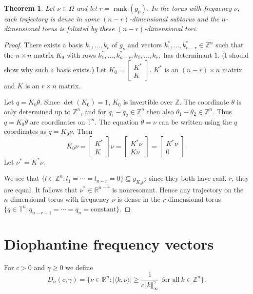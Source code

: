 \documentclass{article}
\newtheorem{theorem}{Theorem}
\newcommand{\norm}[1]{\Vert #1 \Vert}
\newcommand{\rank}{\operatorname{rank}}
\begin{document}
\begin{theorem}
Let $\nu \in \Omega$ and let $r=\rank(g_\nu)$. In the torus with frequency $\nu$, each trajectory is dense in some
$(n-r)$-dimensional subtorus and the $n$-dimensional torus is foliated
by these $(n-r)$-dimensional tori.
\end{theorem}
\begin{proof}
There exists a basis $k_1,\ldots,k_r$ of $g_\nu$ and vectors
$k_1^*,\ldots,k_{n-r}^* \in \mathbb{Z}^n$ such that the $n \times n$ matrix $K_0$ with rows
$k_1^*,\ldots,k_{n-r}^*,k_1,\ldots,k_r,$ has determinant $1$. (I should
show why such a basis exists.)
Let $K_0=\begin{bmatrix}K^*\\K \end{bmatrix}$. $K^*$ is an $(n-r) \times n$ matrix
and $K$ is an $r \times n$ matrix.

Let $q=K_0 \theta$. Since $\det(K_0)=1$, $K_0$ is invertible over
$\mathbb{Z}$. The coordinate $\theta$ is only determined up to
$\mathbb{Z}^n$, and for $q_1-q_2 \in \mathbb{Z}^n$ then also
$\theta_1-\theta_2 \in \mathbb{Z}^n$. Thus $q=K_0 \theta$ are coordinates
on $\mathbb{T}^n$.
The equation $\dot{\theta}=\nu$ can be written using the $q$ coordinates
as $\dot{q}=K_0 \nu$. Then
\[
K_0 \nu=\begin{bmatrix}K^*\\K\end{bmatrix}\nu=
\begin{bmatrix}K^* \nu\\K \nu \end{bmatrix}=
\begin{bmatrix}K^* \nu\\0 \end{bmatrix}.
\]
Let $\nu^*=K^* \nu$.

We see that $\{l \in \mathbb{Z}^n:l_1=\cdots=l_{n-r}=0\} \subseteq g_{K_0 \nu}$; since they both have rank $r$, they are equal. It follows that $\nu^* \in \mathbb{R}^{n-r}$ is
nonresonant. Hence any trajectory on the $n$-dimensional torus with frequency
$\nu$ is dense in the $r$-dimensional torus $\{q \in \mathbb{T}^n:
q_{n-r+1}=\cdots=q_n=\text{constant}\}$.
\end{proof}


\section{Diophantine frequency vectors}
For $c>0$ and $\gamma \geq 0$ we define 
\[
D_n(c,\gamma)=\{\nu \in \mathbb{R}^n: |\langle k,\nu \rangle| \geq
\frac{1}{c\norm{k}_\infty^\gamma} \ \ \textrm{for all} \ k \in \mathbb{Z}^n\}.
\]
\end{document}
